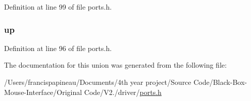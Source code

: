 \-Definition at line 99 of file ports.\-h.

\hypertarget{unions__button__flags_af8b4ed22215bcf4c202e7024db0a7342}{
\subsubsection[{up}]{ {\bf up}}}\label{unions__button__flags_af8b4ed22215bcf4c202e7024db0a7342}


\-Definition at line 96 of file ports.\-h.



\-The documentation for this union was generated from the following file\-:\begin{DoxyCompactItemize}
\item 
/\-Users/francispapineau/\-Documents/4th year project/\-Source Code/\-Black-\/\-Box-\/\-Mouse-\/\-Interface/\-Original Code/\-V2./driver/\hyperlink{ports_8h}{ports.\-h}\end{DoxyCompactItemize}
